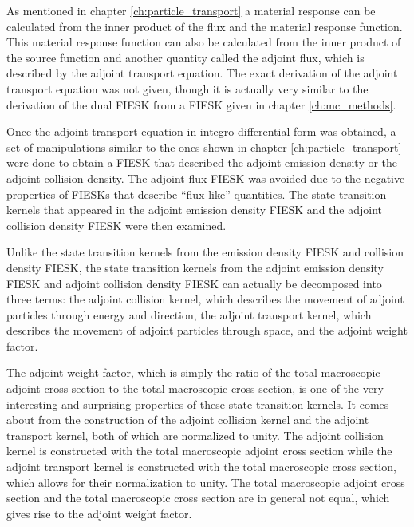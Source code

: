 As mentioned in chapter \ref{ch:particle_transport} a material response can
be calculated from the inner product of the flux and the material response
function. This material response function can also be calculated from the 
inner product of the source function and another quantity called the adjoint
flux, which is described by the adjoint transport equation. The exact 
derivation of the adjoint transport equation was not given, though it is 
actually very similar to the derivation of the dual FIESK from a FIESK given
in chapter \ref{ch:mc_methods}. 

Once the adjoint transport equation in integro-differential form was 
obtained, a set of manipulations similar to the ones shown in chapter
\ref{ch:particle_transport} were done to obtain a FIESK that described the
adjoint emission density or the adjoint collision density. The adjoint flux
FIESK was avoided due to the negative properties of FIESKs that describe 
``flux-like'' quantities. The state transition kernels that appeared in the
adjoint emission density FIESK and the adjoint collision density FIESK were
then examined.

Unlike the state transition kernels from the emission density FIESK and
collision density FIESK, the state transition kernels from the adjoint
emission density FIESK and adjoint collision density FIESK can actually be
decomposed into three terms: the adjoint collision kernel, which describes
the movement of adjoint particles through energy and direction, the adjoint
transport kernel, which describes the movement of adjoint particles through
space, and the adjoint weight factor.

The adjoint weight factor, which is simply the ratio of the total macroscopic
adjoint cross section to the total macroscopic cross section, is one of the 
very interesting and surprising properties of these state transition kernels. It
comes about from the construction of the adjoint collision kernel and the 
adjoint transport kernel, both of which are normalized to unity. The adjoint 
collision kernel is constructed with the total macroscopic adjoint cross
section while the adjoint transport kernel is constructed with the total
macroscopic cross section, which allows for their normalization to unity. The
total macroscopic adjoint cross section and the total macroscopic cross section
are in general not equal, which gives rise to the adjoint weight factor. 


